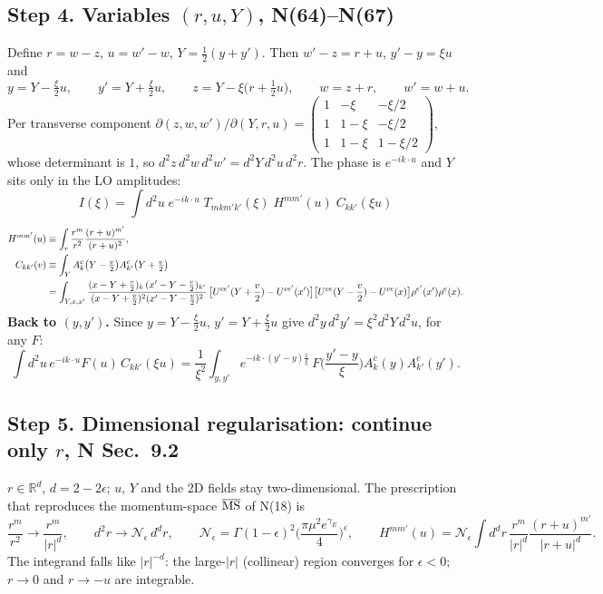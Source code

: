 \documentclass[10pt]{article}
\numberwithin{equation}{section}
\newcommand{\Wop}[2]{\big[U^{ce'}(#2)-U^{ce'}(x')\big]\big[U^{ce}(#1)-U^{ce}(x)\big]\rho^{e'}(x')\rho^{e}(x)}
\begin{document}
\subsection*{Step 4. Variables $(r,u,Y)$, N(64)--N(67)}
Define $r=w-z$, $u=w'-w$, $Y=\frac12(y+y')$. Then $w'-z=r+u$, $y'-y=\xi u$ and
\begin{equation}
y=Y-\tfrac{\xi}{2}u,\qquad y'=Y+\tfrac{\xi}{2}u,\qquad z=Y-\xi\big(r+\tfrac12u\big),\qquad w=z+r,\qquad w'=w+u .
\end{equation}
Per transverse component $\partial(z,w,w')/\partial(Y,r,u)=\begin{pmatrix}1&-\xi&-\xi/2\\1&1-\xi&-\xi/2\\1&1-\xi&1-\xi/2\end{pmatrix}$, whose
determinant is $1$, so $d^2z\,d^2w\,d^2w'=d^2Y\,d^2u\,d^2r$. The phase is $e^{-ik\cdot u}$ and $Y$ sits only in the
LO amplitudes:
\begin{equation}
\boxed{\;I(\xi)=\int d^2u\;e^{-ik\cdot u}\;T_{mkm'k'}(\xi)\;H^{mm'}(u)\;C_{kk'}(\xi u)\;}
\end{equation}
\begin{align}
H^{mm'}(u)&\equiv\int_r\frac{r^m}{r^2}\frac{(r+u)^{m'}}{(r+u)^2},\\
C_{kk'}(v)&\equiv\int_Y A^c_k\big(Y-\tfrac v2\big)A^c_{k'}\big(Y+\tfrac v2\big)\notag\\
&=\int_{Y,x,x'}\frac{(x-Y+\frac v2)_k\,(x'-Y-\frac v2)_{k'}}{(x-Y+\frac v2)^2(x'-Y-\frac v2)^2}\,\Wop{Y-\frac v2}{Y+\frac v2}.
\end{align}
\textbf{Back to $(y,y')$.} Since $y=Y-\frac\xi2u$, $y'=Y+\frac\xi2u$ give $d^2y\,d^2y'=\xi^2d^2Y\,d^2u$, for any $F$:
\begin{equation}
\int d^2u\,e^{-ik\cdot u}F(u)\,C_{kk'}(\xi u)=\frac{1}{\xi^2}\int_{y,y'}e^{-ik\cdot(y'-y)\frac1\xi}\,F\Big(\frac{y'-y}{\xi}\Big)A^c_k(y)A^c_{k'}(y').\label{back}
\end{equation}

\subsection*{Step 5. Dimensional regularisation: continue only $r$, N Sec.~9.2}
$r\in\mathbb R^d$, $d=2-2\epsilon$; $u$, $Y$ and the 2D fields stay two-dimensional. The prescription that
reproduces the momentum-space $\overline{\rm MS}$ of N(18) is
\begin{equation}
\frac{r^m}{r^2}\to\frac{r^m}{|r|^d},\qquad d^2r\to\mathcal N_\epsilon\,d^dr,\qquad
\mathcal N_\epsilon=\Gamma(1-\epsilon)^2\Big(\frac{\pi\mu^2e^{\gamma_E}}{4}\Big)^\epsilon,\qquad
H^{mm'}(u)=\mathcal N_\epsilon\int d^dr\,\frac{r^m}{|r|^d}\frac{(r+u)^{m'}}{|r+u|^d}.
\end{equation}
The integrand falls like $|r|^{-d}$: the large-$|r|$ (collinear) region converges for $\epsilon<0$; $r\to0$ and
$r\to-u$ are integrable.
\end{document}
